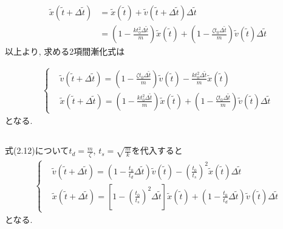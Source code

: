 \documentclass[a4paper,dvipdfmx]{jarticle}
\begin{document}
\begin{align*}
    \tilde{x}(\tilde{t} + \Delta \tilde{t}) &= \tilde{x}(\tilde{t}) + \tilde{v}(\tilde{t} + \Delta \tilde{t}) \Delta \tilde{t} \\
    &= \left(1 - \frac{k t_0^2 \Delta \tilde{t}}{m}\right) \tilde{x}(\tilde{t}) 
    + \left(1 - \frac{\zeta t_0 \Delta \tilde{t}}{m}\right) \tilde{v}(\tilde{t}) \Delta \tilde{t} \tag{2.11}
\end{align*}
以上より, 求める2項間漸化式は

\begin{subequations}
    \begin{align}
    \left\{
        \begin{aligned}
        & \tilde{v}(\tilde{t} + \Delta \tilde{t}) = \left(1 - \frac{\zeta t_0 \Delta \tilde{t}}{m}\right) \tilde{v}(\tilde{t})
        - \frac{k t_0^2 \Delta \tilde{t}}{m} \tilde{x}(\tilde{t})\\
        & \tilde{x}(\tilde{t} + \Delta \tilde{t}) = \left(1 - \frac{k t_0^2 \Delta \tilde{t}}{m}\right) \tilde{x}(\tilde{t}) 
        + \left(1 - \frac{\zeta t_0 \Delta \tilde{t}}{m}\right) \tilde{v}(\tilde{t}) \Delta \tilde{t}
        \end{aligned}
    \right. \tag{2.12}
    \end{align}
\end{subequations}
となる.

\subsection{}

\noindent
式(2.12)について$t_d = \frac{m}{\zeta}$, $t_s = \sqrt{\frac{m}{k}}$を代入すると
\begin{subequations}
    \begin{align}
    \left\{
        \begin{aligned}
        & \tilde{v}(\tilde{t} + \Delta \tilde{t}) = \left(1 - \frac{t_0}{t_d} \Delta \tilde{t} \right) \tilde{v}(\tilde{t})
        - \left(\frac{t_0}{t_s}\right)^2 \tilde{x}(\tilde{t}) \Delta \tilde{t}\\
        & \tilde{x}(\tilde{t} + \Delta \tilde{t}) = \left[1 - \left(\frac{t_0}{t_s}\right)^2 \Delta \tilde{t} \right] \tilde{x}(\tilde{t}) 
        + \left(1 - \frac{t_0}{t_d} \Delta \tilde{t} \right) \tilde{v}(\tilde{t}) \Delta \tilde{t}
        \end{aligned}
    \right. \tag{2.13}
    \end{align}
\end{subequations}
となる.
\end{document}
